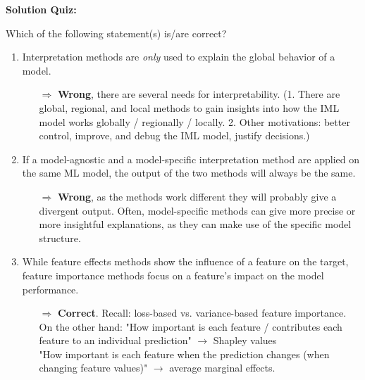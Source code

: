 \textbf{Solution Quiz:}\\\noindent
\medskip

Which of the following statement(s) is/are correct?  
	\begin{enumerate}
        \item Interpretation methods are \textit{only} used to explain the global behavior of a model.
        \begin{itemize}
        	\item[$\Rightarrow$] \textbf{Wrong}, there are several needs for interpretability. (1. There are global, regional, and local methods to gain insights into how the IML model works globally / regionally / locally. 2. Other motivations: better control, improve, and debug the IML model, justify decisions.)
        \end{itemize}
    	\item If a model-agnostic and a model-specific interpretation method are applied on the same ML model, the output of the two methods will always be the same.
    	\begin{itemize}
    		\item[$\Rightarrow$] \textbf{Wrong}, as the methods work different they will probably give a divergent output. Often, model-specific methods can give more precise or more insightful explanations, as they can make use of the specific model structure.
    	\end{itemize}
    	\item While feature effects methods show the influence of a feature on the target, feature importance methods focus on a feature's impact on the model performance.
    	\begin{itemize}
    		\item[$\Rightarrow$] \textbf{Correct}. Recall: loss-based vs. variance-based feature importance. \\
            On the other hand: "How important is each feature / contributes each feature to an individual prediction" \(\rightarrow\) Shapley values \\
            "How important is each feature when the prediction changes (when changing feature values)" \(\rightarrow\) average marginal effects.

\end{itemize}
\end{enumerate}
